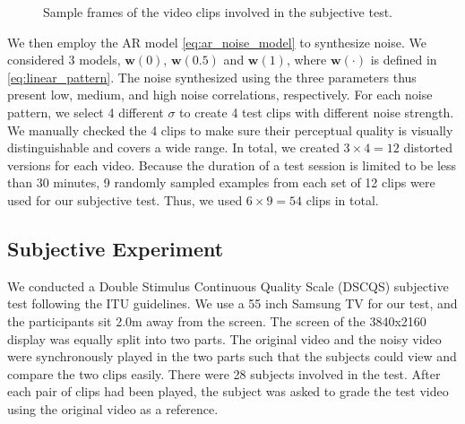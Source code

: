 \documentclass{sig-alternate}
\begin{document}
\begin{figure}[!h]
{}
\caption[Optional caption for list of figures]{
Sample frames of the video clips involved in the subjective test.
}
\label{fig:sampleframe}
\end{figure}

We then employ the AR model \eqref{eq:ar_noise_model} to synthesize noise. We considered 3 models, $\mathbf{w}(0)$, $\mathbf{w}(0.5)$ and $\mathbf{w}(1)$, where $\mathbf{w}(\cdot)$ is defined in \eqref{eq:linear_pattern}. The noise synthesized using the three parameters thus present low, medium, and high noise correlations, respectively. For each noise pattern, we select 4 different $\sigma$ to create 4 test clips with different noise strength. We manually checked the 4 clips to make sure their perceptual quality is visually distinguishable and covers a wide range. In total, we created $3\times4=12$ distorted versions for each video. Because the duration of a test session is limited to be less than 30 minutes, 9 randomly sampled examples from each set of 12 clips were used for our subjective test. Thus, we used $6\times9=54$ clips in total.
\subsection{Subjective Experiment}
\label{sec:subjective_study}
We conducted a Double Stimulus Continuous Quality Scale (DSCQS) subjective test following the ITU guidelines\cite{ITU}. We use a 55 inch Samsung TV for our test, and the participants sit 2.0m away from the screen. 
The screen of the 3840x2160 display was equally split into two parts. The original video and the noisy video were synchronously played in the two parts such that the subjects could view and compare the two clips easily. There were 28 subjects involved in the test. After each pair of clips had been played, the subject was asked to grade the test video using the original video as a reference.
\end{document}
